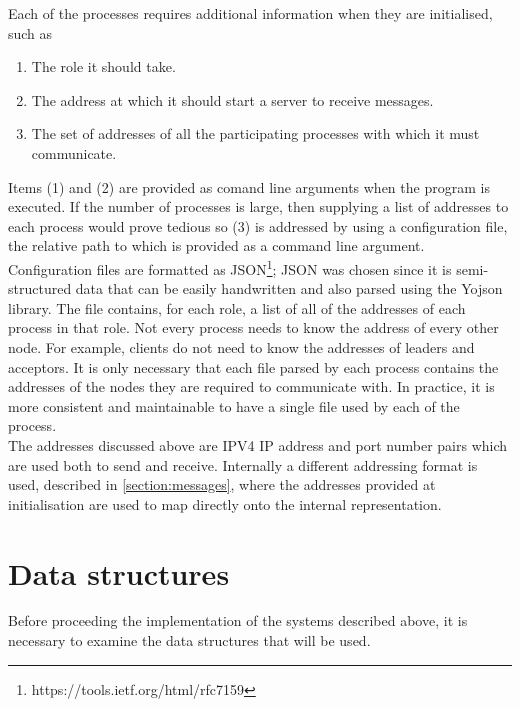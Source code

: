 Each of the processes requires additional information when they are initialised, such as 

\begin{enumerate}
  \item The role it should take.
  \item The address at which it should start a server to receive messages.
  \item The set of addresses of all the participating processes with which it must communicate.
\end{enumerate}

Items (1) and (2) are provided as comand line arguments when the program is executed. If the number of processes is large, then supplying a list of addresses to each process would prove tedious so (3) is addressed by using a configuration file, the relative path to which is provided as a command line argument. \\ 

Configuration files are formatted as JSON\footnote{https://tools.ietf.org/html/rfc7159}; JSON was chosen since it is semi-structured data that can be easily handwritten and also parsed using the Yojson library. The file contains, for each role, a list of all of the addresses of each process in that role. Not every process needs to know the address of every other node. For example, clients do not need to know the addresses of leaders and acceptors. It is only necessary that each file parsed by each process contains the addresses of the nodes they are required to communicate with. In practice, it is more consistent and maintainable to have a single file used by each of the process. \\

The addresses discussed above are IPV4 IP address and port number pairs which are used both to send and receive. Internally a different addressing format is used, described in \ref{section:messages}, where the addresses provided at initialisation are used to map directly onto the internal representation. \\


\section{Data structures}

Before proceeding the implementation of the systems described above, it is necessary to examine the data structures that will be used.

